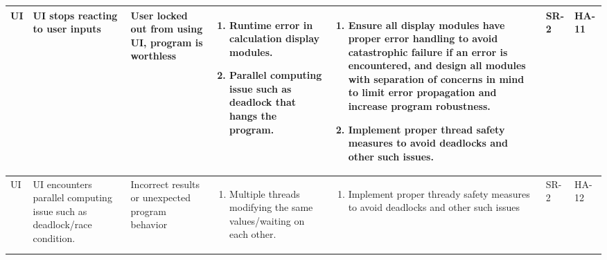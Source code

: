 \documentclass{article}
\begin{document}
\begin{landscape}
\begin{longtable}{|p{} | p{} | p{} | p{} | p{} | p{} | p{}|}
  UI&UI stops reacting to user inputs&User locked out from using UI, program is worthless &
  \begin{enumerate}[leftmargin=*, label={\alph*.}, itemsep=1pt, topsep=0pt, partopsep=0pt] 
    \item Runtime error in calculation display modules.
    \item Parallel computing issue such as deadlock that hangs the program.
  \end{enumerate} & 
  \begin{enumerate}[leftmargin=*, label={\alph*.}, itemsep=1pt, topsep=0pt, partopsep=0pt] 
    \item  Ensure all display modules have proper error handling to avoid catastrophic failure if an error is encountered, and design all modules with separation of concerns in mind to limit error propagation and increase program robustness.
    \item Implement proper thread safety measures to avoid deadlocks and other such issues.
  \end{enumerate} &
  SR-2 & HA-11 \\

  \hline

  UI & UI encounters parallel computing issue such as deadlock/race condition. & 
  Incorrect results or unexpected program behavior &
  \begin{enumerate}[leftmargin=*, label={\alph*.}, itemsep=1pt, topsep=0pt, partopsep=0pt] 
    \item Multiple threads modifying the same values/waiting on each other.
  \end{enumerate} &
  \begin{enumerate}[leftmargin=*, label={\alph*.}, itemsep=1pt, topsep=0pt, partopsep=0pt] 
    \item Implement proper thready safety measures to avoid deadlocks and other such issues
  \end{enumerate} &
  SR-2 & HA-12 \\

  \hline


\end{longtable}
\end{landscape}
\end{document}
